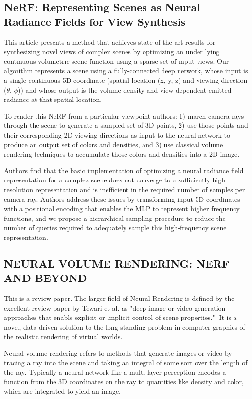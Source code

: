 \documentclass[UTF-8]{ctexart}
\begin{document}
\subsection{NeRF: Representing Scenes as Neural Radiance Fields for View Synthesis}
This article presents a method that achieves state-of-the-art results for synthesizing novel views of complex scenes by optimizing an under lying continuous volumetric scene function using a sparse set of input views. Our algorithm represents a scene using a fully-connected deep network, whose input is a single continuous 5D coordinate (spatial location (x, y, z) and viewing direction ($\theta$, $\phi$)) and whose output is the volume density and view-dependent emitted radiance at that spatial location.

To render this NeRF from a particular viewpoint authors: 1) march camera rays through the scene to generate a sampled set of 3D points, 2) use those points and their corresponding 2D viewing directions as input to the neural network to produce an output set of colors and densities, and 3) use classical volume rendering techniques to accumulate those colors and densities into a 2D image.

Authors find that the basic implementation of optimizing a neural radiance field representation for a complex scene does not converge to a sufficiently high resolution representation and is inefficient in the required number of samples per camera ray. Authors address these issues by transforming input 5D coordinates with a positional encoding that enables the MLP to represent higher frequency functions, and we propose a hierarchical sampling procedure to reduce the number of queries required to adequately sample this high-frequency scene representation.

\subsection{NEURAL VOLUME RENDERING: NERF AND BEYOND}
This is a review paper. The larger field of Neural Rendering is defined by the excellent review paper by Tewari et al. as "deep image or video generation approaches that enable explicit or implicit control of scene properties.". It is a novel, data-driven solution to the long-standing problem in computer graphics of the realistic rendering of virtual worlds.

Neural volume rendering refers to methods that generate images or video by tracing a ray into the scene and taking an integral of some sort over the length of the ray. Typically a neural network like a multi-layer perception encodes a function from the 3D coordinates on the ray to quantities like density and color, which are integrated to yield an image.
\end{document}
